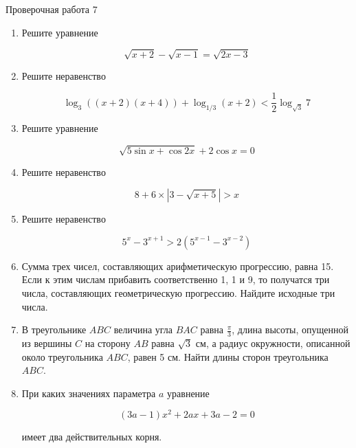 \documentclass[11pt,a5paper]{report}
\begin{document}
\newpage

\begin{center}
Проверочная работа 7


\end{center}

\begin{enumerate}

\item Решите уравнение

$$\sqrt{x+2}-\sqrt{x-1}=\sqrt{2x-3}$$

\item Решите неравенство

$$\log_3((x+2)(x+4))+\log_{1/3}(x+2)<\frac{1}{2}\log_{\sqrt{3}}7$$

\item Решите уравнение

$$\sqrt{5\sin x+\cos 2x}+2\cos x=0$$

\item Решите неравенство

$$8+6\times|3-\sqrt{x+5}|>x$$


\item Решите неравенство

$$5^x-3^{x+1}>2(5^{x-1}-3^{x-2})$$

\item Сумма трех чисел, составляющих арифметическую прогрессию, равна 15. Если к этим числам прибавить соответственно 1, 1 и 9, то получатся три числа, составляющих геометрическую прогрессию. Найдите исходные три числа.

\item В треугольнике $ABC$ величина угла $BAC$ равна $\frac{\pi}{3}$, длина высоты, опущенной из вершины $C$ на сторону $AB$ равна $\sqrt{3}$ см, а радиус окружности, описанной около треугольника $ABC$, равен 5 см. Найти длины сторон треугольника $ABC$.

\item При каких значениях параметра $a$ уравнение

$$(3a-1)x^2+2ax+3a-2=0$$

имеет два действительных корня.

\end{enumerate}

\newpage
\end{document}
